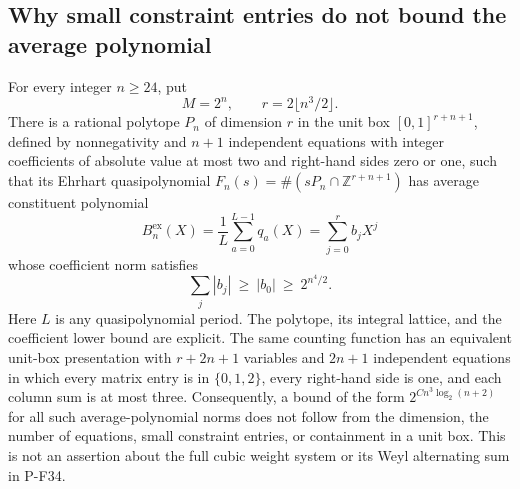 \subsection{Why small constraint entries do not bound the average polynomial}

\begin{proposition}
\label{prop:boundedentryaverage}
For every integer $n\ge24$, put
\[
 M=2^n,\qquad r=2\lfloor n^3/2\rfloor.
 \tag{P-F38a}
\]
There is a rational polytope $P_n$ of dimension $r$ in the
unit box $[0,1]^{r+n+1}$, defined by nonnegativity and $n+1$
independent equations with integer coefficients of absolute
value at most two and right-hand sides zero or one, such that
its Ehrhart quasipolynomial $F_n(s)=\#(sP_n\cap\mathbb Z^{r+n+1})$
has average constituent polynomial
\[
 B_n^{\mathrm{ex}}(X)=\frac1L\sum_{a=0}^{L-1}q_a(X)
      =\sum_{j=0}^{r}b_jX^j
\]
whose coefficient norm satisfies
\[
 \sum_j|b_j|\ \ge\ |b_0|\ \ge\ 2^{n^4/2}.
 \tag{P-F38b}
\]
Here $L$ is any quasipolynomial period. The polytope, its
integral lattice, and the coefficient lower bound are explicit.
The same counting function has an equivalent unit-box
presentation with $r+2n+1$ variables and $2n+1$ independent
equations in which every matrix entry is in $\{0,1,2\}$,
every right-hand side is one, and each column sum is at most
three.
Consequently, a bound of the form
$2^{C n^3\log_2(n+2)}$ for all such average-polynomial norms
does not follow from the dimension, the number of equations,
small constraint entries, or containment in a unit box.
This is not an assertion about the full cubic weight system
or its Weyl alternating sum in P-F34.
\end{proposition}

